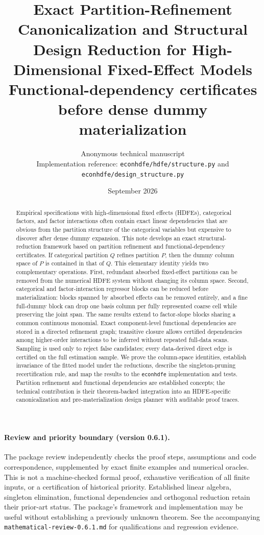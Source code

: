 \documentclass[11pt]{article}
\title{\textbf{Exact Partition-Refinement Canonicalization and Structural Design Reduction for High-Dimensional Fixed-Effect Models}\\
\large Functional-dependency certificates before dense dummy materialization}
\author{Anonymous technical manuscript\\[2pt]\small Implementation reference: \texttt{econhdfe/hdfe/structure.py} and \texttt{econhdfe/design\_structure.py}}
\date{September 2026}
\theoremstyle{definition}
\newcommand{\1}{\mathbf{1}}
\begin{document}
\maketitle

\begin{abstract}
Empirical specifications with high-dimensional fixed effects (HDFEs), categorical factors, and factor interactions often contain exact linear dependencies that are obvious from the partition structure of the categorical variables but expensive to discover after dense dummy expansion. This note develops an exact structural-reduction framework based on partition refinement and functional-dependency certificates. If categorical partition $Q$ refines partition $P$, then the dummy column space of $P$ is contained in that of $Q$. This elementary identity yields two complementary operations. First, redundant absorbed fixed-effect partitions can be removed from the numerical HDFE system without changing its column space. Second, categorical and factor-interaction regressor blocks can be reduced before materialization: blocks spanned by absorbed effects can be removed entirely, and a fine full-dummy block can drop one basis column per fully represented coarse cell while preserving the joint span. The same results extend to factor-slope blocks sharing a common continuous monomial. Exact component-level functional dependencies are stored in a directed refinement graph; transitive closure allows certified dependencies among higher-order interactions to be inferred without repeated full-data scans. Sampling is used only to reject false candidates; every data-derived direct edge is certified on the full estimation sample. We prove the column-space identities, establish invariance of the fitted model under the reductions, describe the singleton-pruning recertification rule, and map the results to the \texttt{econhdfe} implementation and tests. Partition refinement and functional dependencies are established concepts; the technical contribution is their theorem-backed integration into an HDFE-specific canonicalization and pre-materialization design planner with auditable proof traces.
\end{abstract}

\paragraph{Review and priority boundary (version 0.6.1).}
The package review independently checks the proof steps, assumptions and code
correspondence, supplemented by exact finite examples and numerical oracles.
This is not a machine-checked formal proof, exhaustive verification of all finite
inputs, or a certification of historical priority. Established linear algebra,
singleton elimination, functional dependencies and orthogonal reduction retain
their prior-art status. The package's framework and implementation may be useful
without establishing a previously unknown theorem. See the accompanying
\texttt{mathematical-review-0.6.1.md} for qualifications and regression evidence.
\end{document}

